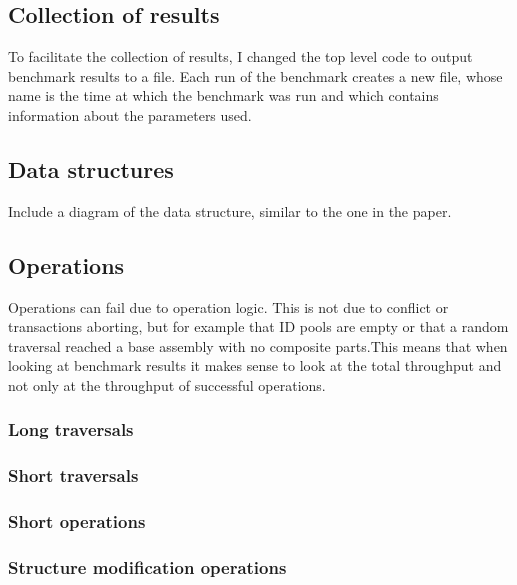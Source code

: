 \documentclass[12pt,a4paper,oneside,openright]{report}
\begin{document}
\subsection{Collection of results}
\label{sec:impl:collection-results}

To facilitate the collection of results, I changed the top level code
to output benchmark results to a file. Each run of the benchmark
creates a new file, whose name is the time at which the benchmark was
run and which contains information about the parameters used.

\subsection{Data structures}
\label{sec:impl:data-structures}

Include a diagram of the data structure, similar to the one in the
paper.

\subsection{Operations}
\label{sec:impl:operations}

Operations can fail due to operation logic. This is not due to
conflict or transactions aborting, but for example that ID pools are
empty or that a random traversal reached a base assembly with no
composite parts.This means that when looking at benchmark results it
makes sense to look at the total throughput and not only at the
throughput of successful operations.

\subsubsection{Long traversals}
\label{sec:impl:long-traversals}

\subsubsection{Short traversals}
\label{sec:impl:short-traversals}

\subsubsection{Short operations}
\label{sec:impl:short-operations}

\subsubsection{Structure modification operations}
\label{sec:impl:struct-modif-oper}
\end{document}
